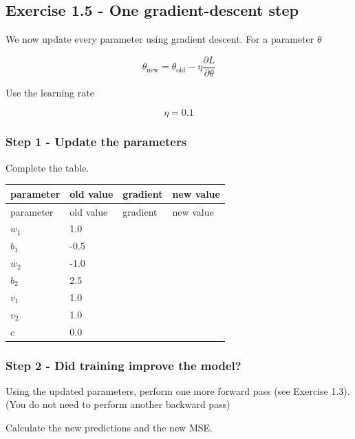 \documentclass{course_sheet}
\begin{document}
\subsection*{Exercise 1.5 - One gradient-descent step}
We now update every parameter using gradient descent. For a parameter $\theta$

\[
\theta_{\mathrm{new}}=\theta_{\mathrm{old}}-\eta\frac{\partial L}{\partial\theta}
\]

Use the learning rate

\[
\eta=0.1
\]

\subsubsection*{Step 1 - Update the parameters}
Complete the table.

\begingroup
\small
\setlength{\tabcolsep}{4pt}
\begin{longtable}{l|l|l|l}
parameter & old value & gradient & new value \\[1.5pt]
\hline
\endfirsthead
parameter & old value & gradient & new value \\[1.5pt]
\hline
\endhead
\rule{0pt}{2.4ex}$w_1$ & 1.0 &  $\phantom{-0.00}$ &  $\phantom{-0.00}$ \\[3pt]
\rule{0pt}{2.4ex}$b_1$ & -0.5 &  $\phantom{-0.00}$ &  $\phantom{-0.00}$ \\[3pt]
\rule{0pt}{2.4ex}$w_2$ & -1.0 &  $\phantom{-0.00}$ &  $\phantom{-0.00}$ \\[3pt]
\rule{0pt}{2.4ex}$b_2$ & 2.5 &  $\phantom{-0.00}$ &  $\phantom{-0.00}$ \\[3pt]
\rule{0pt}{2.4ex}$v_1$ & 1.0 &  $\phantom{-0.00}$ &  $\phantom{-0.00}$ \\[3pt]
\rule{0pt}{2.4ex}$v_2$ & 1.0 &  $\phantom{-0.00}$ &  $\phantom{-0.00}$ \\[3pt]
\rule{0pt}{2.4ex}$c$ & 0.0 &  $\phantom{-0.00}$ &  $\phantom{-0.00}$ \\[3pt]
\end{longtable}
\endgroup
\subsubsection*{Step 2 - Did training improve the model?}
Using the updated parameters, perform one more forward pass (see Exercise 1.3). (You do not need to perform another backward pass)

Calculate the new predictions and the new MSE.
\end{document}
